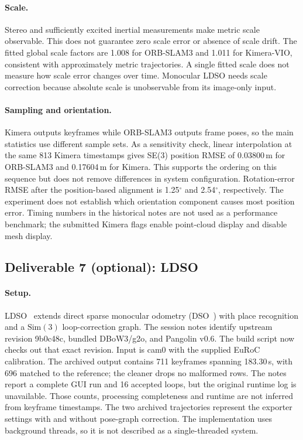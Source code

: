 \documentclass[11pt,a4paper]{article}
\DeclareRobustCommand{\code}[1]{\begingroup\ttfamily\codebreaks#1\endgroup}
\newcommand{\codebreaks}{\renewcommand{\_}{\textunderscore\allowbreak}}
\begin{document}
\paragraph{Scale.} Stereo and sufficiently excited inertial measurements make metric
scale observable. This does not guarantee zero scale error or absence of scale drift.
The fitted global scale factors are 1.008 for ORB-SLAM3 and 1.011 for Kimera-VIO,
consistent with approximately metric trajectories. A single fitted scale does not measure
how scale error changes over time. Monocular LDSO needs scale correction because absolute
scale is unobservable from its image-only input.

\paragraph{Sampling and orientation.} Kimera outputs keyframes while ORB-SLAM3 outputs
frame poses, so the main statistics use different sample sets. As a sensitivity check,
linear interpolation at the same 813 Kimera timestamps gives SE(3) position RMSE of
0.03800\,m for ORB-SLAM3 and 0.17604\,m for Kimera. This supports the ordering on this
sequence but does not remove differences in system configuration. Rotation-error RMSE
after the position-based alignment is 1.25$^\circ$ and 2.54$^\circ$, respectively. The
experiment does not establish which orientation component causes most position error.
Timing numbers in the historical notes are not used as a performance benchmark; the
submitted Kimera flags enable point-cloud display and disable mesh display.

\subsection{Deliverable 7 (optional): LDSO}\label{sec:d7}

\paragraph{Setup.} LDSO~\cite{gao2018ldso} extends direct sparse monocular odometry
(DSO~\cite{engel2018dso}) with place recognition and a $\mathrm{Sim}(3)$ loop-correction graph.
The session notes identify upstream revision \code{9b0c48c}, bundled DBoW3/g2o, and
Pangolin v0.6. The build script now checks out that exact revision. Input is cam0 with
the supplied EuRoC calibration. The archived output contains 711 keyframes spanning
183.30\,s, with 696 matched to the reference; the cleaner drops no malformed rows.
The notes report a complete GUI run and 16 accepted loops, but the original runtime log
is unavailable. Those counts, processing completeness and runtime are not inferred from
keyframe timestamps. The two archived trajectories represent the exporter settings with
and without pose-graph correction. The implementation uses background threads, so it is
not described as a single-threaded system.
\end{document}
